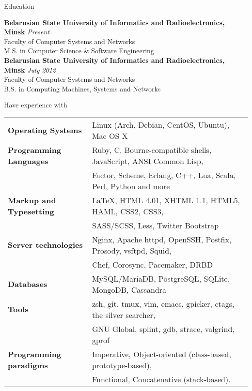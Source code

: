 \documentclass{resume} %
\begin{document}

\begin{rSection}{Education}

{\bf Belarusian State University of Informatics and Radioelectronics, Minsk} \hfill {\em Present} \\ 
Faculty of Computer Systems and Networks \\
M.S. in Computer Science \& Software Engineering \smallskip \\
{\bf Belarusian State University of Informatics and Radioelectronics, Minsk} \hfill {\em July 2012} \\ 
Faculty of Computer Systems and Networks \\
B.S. in Computing Machines, Systems and Networks \\

\end{rSection}


\begin{rSection}{Have experience with}

\begin{tabular}{ @{} >{\bfseries}l @{\hspace{6ex}} l }
Operating Systems     & Linux (Arch, Debian, CentOS, Ubuntu), Mac OS X \smallskip \\
Programming Languages & Ruby, C, Bourne-compatible shells, JavaScript, ANSI Common Lisp, \\
                      & Factor, Scheme, Erlang, C++, Lua, Scala, Perl, Python and more\smallskip \\
Markup and Typesetting & \LaTeX, HTML 4.01, XHTML 1.1, HTML5, HAML, CSS2, CSS3, \\
                       & SASS/SCSS, Less, Twitter Bootstrap \smallskip \\
Server technologies   & Nginx, Apache httpd, OpenSSH, Postfix, Prosody, vsftpd, Squid, \\
                      & Chef, Corosync, Pacemaker, DRBD \smallskip \\
Databases & MySQL/MariaDB, PostgreSQL, SQLite, MongoDB, Cassandra \smallskip \\
Tools & zsh, git, tmux, vim, emacs, gpicker, ctags, the silver searcher, \\
      &    GNU Global, splint, gdb, strace, valgrind, gprof \smallskip \\
Programming paradigms & Imperative, Object-oriented (class-based, prototype-based), \\
                      & Functional, Concatenative (stack-based).
\end{tabular}

\end{rSection}
\end{document}

